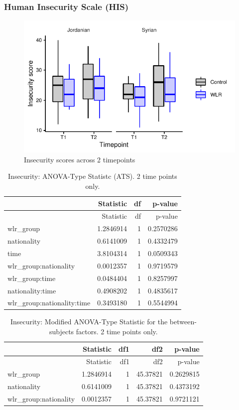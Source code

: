 \documentclass[]{article}
\begin{document}
\newpage

\hypertarget{human-insecurity-scale-his-1}{%
\subsubsection{Human Insecurity Scale
(HIS)}\label{human-insecurity-scale-his-1}}

\begin{figure}[H]

{\centering \includegraphics{WLR-analyses-report_files/figure-latex/unnamed-chunk-31-1} 

}

\caption{Insecurity scores across 2 timepoints}\label{fig:unnamed-chunk-31}
\end{figure}

\begin{longtable}[]{@{}lrrr@{}}
\caption{Insecurity: ANOVA-Type Statistc (ATS). 2 time points
only.}\tabularnewline
\toprule
& Statistic & df & p-value\tabularnewline
\midrule
\endfirsthead
\toprule
& Statistic & df & p-value\tabularnewline
\midrule
\endhead
wlr\_group & 1.2846914 & 1 & 0.2570286\tabularnewline
nationality & 0.6141009 & 1 & 0.4332479\tabularnewline
time & 3.8104314 & 1 & 0.0509343\tabularnewline
wlr\_group:nationality & 0.0012357 & 1 & 0.9719579\tabularnewline
wlr\_group:time & 0.0484404 & 1 & 0.8257997\tabularnewline
nationality:time & 0.4908202 & 1 & 0.4835617\tabularnewline
wlr\_group:nationality:time & 0.3493180 & 1 & 0.5544994\tabularnewline
\bottomrule
\end{longtable}

\begin{longtable}[]{@{}lrrrr@{}}
\caption{Insecurity: Modified ANOVA-Type Statistic for the
between-subjects factors. 2 time points only.}\tabularnewline
\toprule
& Statistic & df1 & df2 & p-value\tabularnewline
\midrule
\endfirsthead
\toprule
& Statistic & df1 & df2 & p-value\tabularnewline
\midrule
\endhead
wlr\_group & 1.2846914 & 1 & 45.37821 & 0.2629815\tabularnewline
nationality & 0.6141009 & 1 & 45.37821 & 0.4373192\tabularnewline
wlr\_group:nationality & 0.0012357 & 1 & 45.37821 &
0.9721121\tabularnewline
\bottomrule
\end{longtable}
\end{document}
